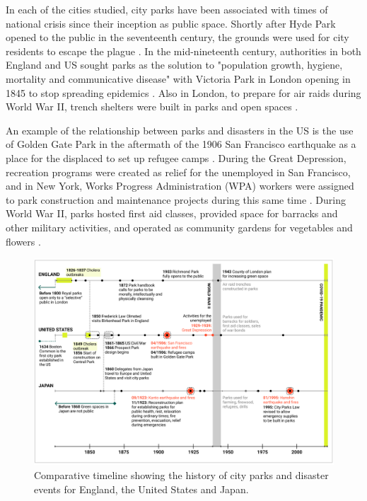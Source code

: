 \begin{multicols}{2}
In each of the cities studied, city parks have been associated with times of national crisis since their inception as public space. Shortly after Hyde Park opened to the public in the seventeenth century, the grounds were used for city residents to escape the plague \cite{noauthor_history_nodate}. In the mid-nineteenth century, authorities in both England and US sought parks as the solution to "population growth, hygiene, mortality and communicative disease" with Victoria Park in London opening in 1845 to stop spreading epidemics \cite{jones_lungs_2018}. Also in London, to prepare for air raids during World War II, trench shelters were built in parks and open spaces \cite{ainsworth_geophysical_2018}. 

An example of the relationship between parks and disasters in the US is the use of Golden Gate Park in the aftermath of the 1906 San Francisco earthquake as a place for the displaced to set up refugee camps \cite{cranz_politics_1989}. During the Great Depression, recreation programs were created as relief for the unemployed in San Francisco, and in New York, Works Progress Administration (WPA) workers were assigned to park construction and maintenance projects during this same time \cite{cranz_politics_1989}. During World War II, parks hosted first aid classes, provided space for barracks and other military activities, and operated as community gardens for vegetables and flowers \cite{cranz_politics_1989}. 

\end{multicols}

\begin{figure}[h]
  \centering
  \vspace{8pt}
  \includegraphics[width=1.0\textwidth]{images/crisis/timeline.png}
  \captionsetup{width=1.0\linewidth}
  \caption[Timeline diagram]{Comparative timeline showing the history of city parks and disaster events for England, the United States and Japan.}
  \label{fig:timeline}
\end{figure}\par

